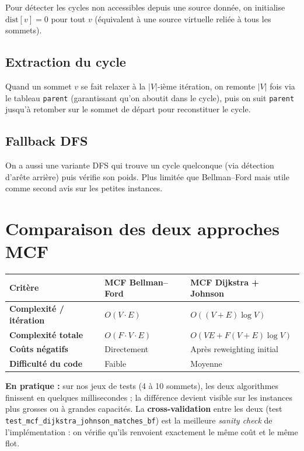 \documentclass[11pt,a4paper]{article}
\begin{document}
Pour détecter les cycles non accessibles depuis une source donnée, on
initialise $\text{dist}[v] = 0$ pour tout $v$ (équivalent à une source
virtuelle reliée à tous les sommets).

\subsection{Extraction du cycle}

Quand un sommet $v$ se fait relaxer à la $|V|$-ième itération, on remonte
$|V|$ fois via le tableau \texttt{parent} (garantissant qu'on aboutit
dans le cycle), puis on suit \texttt{parent} jusqu'à retomber sur le
sommet de départ pour reconstituer le cycle.

\subsection{Fallback DFS}

On a aussi une variante DFS qui trouve un cycle quelconque (via détection
d'arête arrière) puis vérifie son poids. Plus limitée que Bellman--Ford
mais utile comme second avis sur les petites instances.

\section{Comparaison des deux approches MCF}
\label{sec:comparaison}

\begin{center}
\renewcommand{\arraystretch}{1.35}
\begin{tabular}{>{\bfseries}p{4.0cm} p{4.7cm} p{5.0cm}}
\toprule
\textbf{Critère} & \textbf{MCF Bellman--Ford} & \textbf{MCF Dijkstra + Johnson} \\
\midrule
Complexité / itération    & $O(V \cdot E)$               & $O((V+E)\log V)$ \\
Complexité totale         & $O(F \cdot V \cdot E)$       & $O(VE + F(V+E)\log V)$ \\
Coûts négatifs            & Directement                  & Après reweighting initial \\
Difficulté du code        & Faible                       & Moyenne \\
\bottomrule
\end{tabular}
\end{center}

\textbf{En pratique :} sur nos jeux de tests (4 à 10 sommets), les deux
algorithmes finissent en quelques millisecondes ; la différence devient
visible sur les instances plus grosses ou à grandes capacités. La
\textbf{cross-validation} entre les deux (test
\texttt{test\_mcf\_dijkstra\_johnson\_matches\_bf}) est la meilleure
\emph{sanity check} de l'implémentation : on vérifie qu'ils renvoient
exactement le même coût et le même flot.
\end{document}

